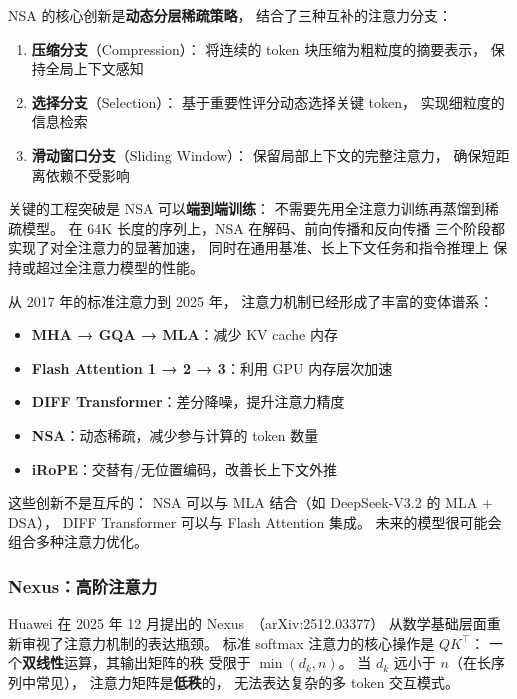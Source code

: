 NSA 的核心创新是\textbf{动态分层稀疏策略}，
结合了三种互补的注意力分支：
\begin{enumerate}[noitemsep]
  \item \textbf{压缩分支}（Compression）：
        将连续的 token 块压缩为粗粒度的摘要表示，
        保持全局上下文感知
  \item \textbf{选择分支}（Selection）：
        基于重要性评分动态选择关键 token，
        实现细粒度的信息检索
  \item \textbf{滑动窗口分支}（Sliding Window）：
        保留局部上下文的完整注意力，
        确保短距离依赖不受影响
\end{enumerate}

关键的工程突破是 NSA 可以\textbf{端到端训练}：
不需要先用全注意力训练再蒸馏到稀疏模型。
在 64K 长度的序列上，NSA 在解码、前向传播和反向传播
三个阶段都实现了对全注意力的显著加速，
同时在通用基准、长上下文任务和指令推理上
保持或超过全注意力模型的性能。

\begin{corebox}[注意力机制的演化谱系]
从 2017 年的标准注意力到 2025 年，
注意力机制已经形成了丰富的变体谱系：
\begin{itemize}[noitemsep]
  \item \textbf{MHA → GQA → MLA}：减少 KV cache 内存
  \item \textbf{Flash Attention 1 → 2 → 3}：利用 GPU 内存层次加速
  \item \textbf{DIFF Transformer}：差分降噪，提升注意力精度
  \item \textbf{NSA}：动态稀疏，减少参与计算的 token 数量
  \item \textbf{iRoPE}：交替有/无位置编码，改善长上下文外推
\end{itemize}
这些创新不是互斥的：
NSA 可以与 MLA 结合（如 DeepSeek-V3.2 的 MLA + DSA），
DIFF Transformer 可以与 Flash Attention 集成。
未来的模型很可能会组合多种注意力优化。
\end{corebox}

\subsubsection{Nexus：高阶注意力}

Huawei 在 2025 年 12 月提出的
Nexus~\cite{nexus2025}（arXiv:2512.03377）
从数学基础层面重新审视了注意力机制的表达瓶颈。
标准 softmax 注意力的核心操作是 $QK^\top$：
一个\textbf{双线性}运算，其输出矩阵的秩
受限于 $\min(d_k, n)$。
当 $d_k$ 远小于 $n$（在长序列中常见），
注意力矩阵是\textbf{低秩}的，
无法表达复杂的多 token 交互模式。

